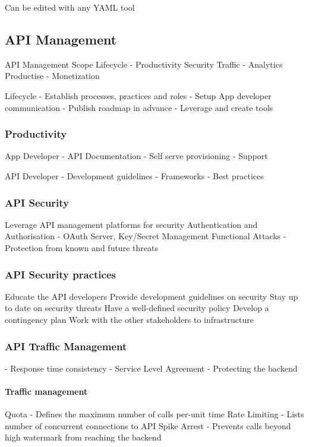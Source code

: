 Can be edited with any YAML tool

\subsection{API Management}

API Management Scope
Lifecycle - Productivity
Security
Traffic - Analytics
Productise - Monetization


Lifecycle
- Establish processes, practices and roles
- Setup App developer communication
- Publish roadmap in advance
- Leverage and create tools

\subsubsection{Productivity}
App Developer
- API Documentation
- Self serve provisioning
- Support

API Developer
- Development guidelines
- Frameworks
- Best practices

\subsubsection{API Security}
Leverage API management platforms for security
Authentication and Authorisation - OAuth Server, Key/Secret Management
Functional Attacks - Protection from known and future threats

\subsubsection{API Security practices}
Educate the API developers
Provide development guidelines on security
Stay up to date on security threats
Have a well-defined security policy
Develop a contingency plan
Work with the other stakeholders to infrastructure

\subsubsection{API Traffic Management}
- Response time consistency
- Service Level Agreement
- Protecting the backend

\paragraph{Traffic management}
Quota - Defines the maximum number of calls per-unit time
Rate Limiting - Lists number of concurrent connections to API
Spike Arrest - Prevents calls beyond high watermark from reaching the backend %

